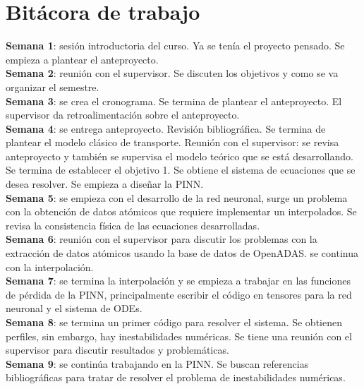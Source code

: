 \section{Bitácora de trabajo}

\textbf{Semana 1}: sesión introductoria del curso. Ya se tenía el proyecto pensado. Se empieza a plantear el anteproyecto.\\

\textbf{Semana 2}: reunión con el supervisor. Se discuten los objetivos y como se va organizar el semestre.\\

\textbf{Semana 3}: se crea el cronograma. Se termina de plantear el anteproyecto. El supervisor da retroalimentación sobre el anteproyecto. \\

\textbf{Semana 4}:  se entrega anteproyecto. Revisión bibliográfica. Se termina de plantear el modelo clásico de transporte. Reunión con el supervisor: se revisa anteproyecto y también se supervisa el modelo teórico que se está desarrollando. Se termina de establecer el objetivo 1. Se obtiene el sistema de ecuaciones que se desea resolver. Se empieza a diseñar la PINN.\\ 

\textbf{Semana 5}:  se empieza con el desarrollo de la red neuronal, surge un problema con la obtención de datos atómicos que requiere implementar un interpolados. Se revisa la consistencia física de las ecuaciones desarrolladas.\\

\textbf{Semana 6}:  reunión con el supervisor para discutir los problemas con la extracción de datos atómicos usando la base de datos de OpenADAS. se continua con la interpolación.    \\

\textbf{Semana 7}: se termina la interpolación y se empieza a trabajar en las funciones de pérdida de la PINN, principalmente escribir el código en tensores para la red neuronal y el sistema de ODEs.\\

\textbf{Semana 8}: se termina un primer código para resolver el sistema. Se obtienen perfiles, sin embargo, hay inestabilidades numéricas. Se tiene una reunión con el supervisor para discutir resultados y problemáticas.\\

\textbf{Semana 9}: se continúa trabajando en la PINN. Se buscan referencias bibliográficas \cite{chen2026} para tratar de resolver el problema de inestabilidades numéricas.\\

